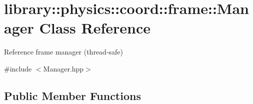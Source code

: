 \hypertarget{classlibrary_1_1physics_1_1coord_1_1frame_1_1_manager}{}\section{library\+:\+:physics\+:\+:coord\+:\+:frame\+:\+:Manager Class Reference}
\label{classlibrary_1_1physics_1_1coord_1_1frame_1_1_manager}


Reference frame manager (thread-\/safe)  




{\ttfamily \#include $<$Manager.\+hpp$>$}

\subsection*{Public Member Functions}
